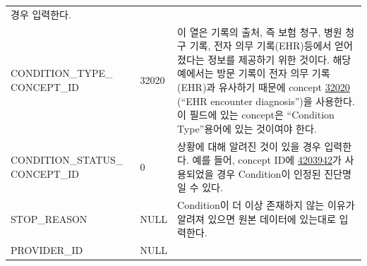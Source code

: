 \documentclass[11pt]{book}
\theoremstyle{definition}
\theoremstyle{definition}
\theoremstyle{definition}
\theoremstyle{remark}
\begin{document}
\begin{longtable}[]{@{}lll@{}}
\begin{minipage}[t]{0.48\columnwidth}
경우 입력한다.\strut
\end{minipage}\tabularnewline
\begin{minipage}[t]{0.28\columnwidth}\raggedright\strut
CONDITION\_TYPE\_ CONCEPT\_ID\strut
\end{minipage} & \begin{minipage}[t]{0.16\columnwidth}\raggedright\strut
32020\strut
\end{minipage} & \begin{minipage}[t]{0.48\columnwidth}\raggedright\strut
이 열은 기록의 출처, 즉 보험 청구, 병원 청구 기록, 전자 의무
기록(EHR)등에서 얻어 졌다는 정보를 제공하기 위한 것이다. 해당 예에서는
방문 기록이 전자 의무 기록(EHR)과 유사하기 때문에 concept
\href{http://athena.ohdsi.org/search-terms/terms/32020}{32020} (``EHR
encounter diagnosis'')을 사용한다. 이 필드에 있는 concept은 ``Condition
Type''용어에 있는 것이여야 한다.\strut
\end{minipage}\tabularnewline
\begin{minipage}[t]{0.28\columnwidth}\raggedright\strut
CONDITION\_STATUS\_ CONCEPT\_ID\strut
\end{minipage} & \begin{minipage}[t]{0.16\columnwidth}\raggedright\strut
0\strut
\end{minipage} & \begin{minipage}[t]{0.48\columnwidth}\raggedright\strut
상황에 대해 알려진 것이 있을 경우 입력한다. 예를 들어, concept ID에
\href{http://athena.ohdsi.org/search-terms/terms/4203942}{4203942}가
사용되었을 경우 Condition이 인정된 진단명일 수 있다.\strut
\end{minipage}\tabularnewline
\begin{minipage}[t]{0.28\columnwidth}\raggedright\strut
STOP\_REASON\strut
\end{minipage} & \begin{minipage}[t]{0.16\columnwidth}\raggedright\strut
NULL\strut
\end{minipage} & \begin{minipage}[t]{0.48\columnwidth}\raggedright\strut
Condition이 더 이상 존재하지 않는 이유가 알려져 있으면 원본 데이터에
있는대로 입력한다.\strut
\end{minipage}\tabularnewline
\begin{minipage}[t]{0.28\columnwidth}\raggedright\strut
PROVIDER\_ID\strut
\end{minipage} & \begin{minipage}[t]{0.16\columnwidth}\raggedright\strut
NULL\strut
\end{minipage} & \begin{minipage}[t]{0.48\columnwidth}\raggedright\strut

\end{minipage}
\end{longtable}
\end{document}
